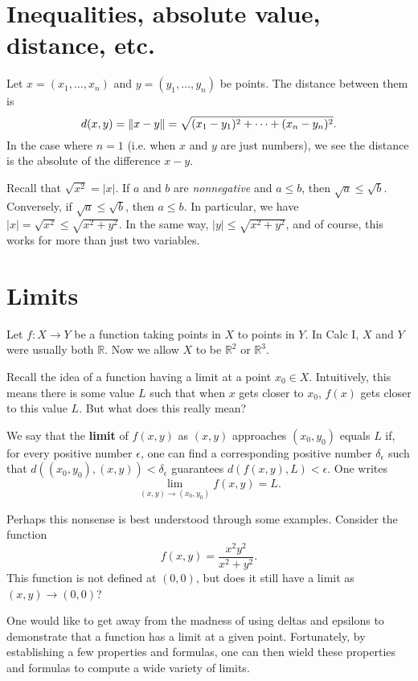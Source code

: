 \documentclass{article}
\begin{document}


\section*{Inequalities, absolute value, distance, etc.}
Let $x=(x_1,\ldots,x_n)$ and $y=(y_1,\ldots,y_n)$ be points. The distance
between them is 
\[ d(x,y)=\norm{x-y}= \sqrt{(x_1-y_1)^2+\cdots+(x_n-y_n)^2} .\]
In the case where $n=1$ (i.e. when $x$ and $y$ are just numbers), we see
the distance is the absolute of the difference $x-y$.

Recall that $\sqrt{x^2}=|x|$. If $a$ and $b$ are \emph{nonnegative} and $a\leq b$, then 
$\sqrt{a} \leq \sqrt{b}$. Conversely, if $\sqrt{a} \leq \sqrt{b}$, then $a\leq b$. In particular,
we have $|x|=\sqrt{x^2} \leq \sqrt{x^2 + y^2}$. In the same way, $|y| \leq \sqrt{x^2+y^2}$, and of course,
this works for more than just two variables.

\section*{Limits}
Let $f: X \to Y$ be a function taking points in $X$ to points in $Y$. In Calc I, $X$ and $Y$ were usually both $\mathbb{R}$. Now we allow $X$ to be $\mathbb{R}^2$ or $\mathbb{R}^3$.  

Recall the idea of a function having a limit at a point $x_0 \in X$. Intuitively, this means there is
some value $L$ such that when $x$ gets closer to $x_0$, $f(x)$ gets closer to this value $L$. But what does 
this really mean?

\begin{definition}
    We say that the \textbf{limit} of $f(x,y)$ as $(x,y)$ approaches $(x_0,y_0)$ equals $L$ if, 
    for every positive number $\epsilon$, one can find a corresponding positive number $\delta_\epsilon$ such that
    $d((x_0,y_0),(x,y)) < \delta_\epsilon$ guarantees $d(f(x,y),L) < \epsilon$. One writes
    \[\lim_{(x,y)\to (x_0,y_0)} f(x,y) = L.\]
\end{definition}


Perhaps this nonsense is best understood through some examples. Consider the function 
\[f(x,y)=\frac{x^2 y^2}{x^2+y^2}.\]
This function is not defined at $(0,0)$, but does it still have a limit as $(x,y) \to (0,0)$? 

One would like to get away from the madness of using deltas and epsilons to demonstrate that a function
has a limit at a given point. Fortunately, by establishing a few properties and formulas, one can then wield
these properties and formulas to compute a wide variety of limits.

\end{document}
